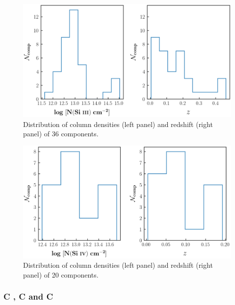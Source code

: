 \begin{figure}
    \centering
    \includegraphics[width=\linewidth]{Figures/SiIII_distribution_survey.png}
    \caption{Distribution of column densities (left panel) and redshift (right panel) of 36  components.}
    \label{fig:SiIII_distribution}
\end{figure}

\begin{figure}
    \centering
    \includegraphics[width=\linewidth]{Figures/SiIV_distribution_survey.png}
    \caption{Distribution of column densities (left panel) and redshift (right panel) of 20  components.}
    \label{fig:SiIV_distribution}
\end{figure}

\subsubsection*{C \hspace*{-0.5mm}{\footnotesize II}, C \hspace*{-0.5mm}{\footnotesize III} and C \hspace*{-0.5mm}{\footnotesize IV}}




